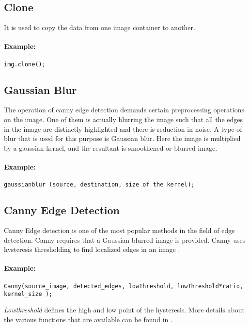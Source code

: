 \subsection{Clone}
\label{sec: Clone}
It is used to copy  the data from one image container to another.
\paragraph{Example:}
\begin{lstlisting}
img.clone();
\end{lstlisting}
\subsection{Gaussian Blur}
\label{sec: Gaussian Blur}
The operation of canny edge detection demands certain preprocessing operations on the image. One of them is actually blurring the image such that all the edges in the image are distinctly highlighted and there is reduction in noise. A type of blur that is used for this purpose is Gaussian blur. Here the image is multiplied by a gaussian kernel, and the resultant is smoothened or blurred image.
\paragraph{Example:}
\begin{lstlisting}
gaussianblur (source, destination, size of the kernel);
\end{lstlisting}
\subsection{Canny Edge Detection}
\label{sec: Canny}
Canny Edge detection is one of the most popular methods in the field of edge detection. Canny requires that a Gaussian blurred image is provided. Canny uses hysteresis thresholding to find localized edges in an image \cite{ding2001canny}.
\paragraph{Example:}
\begin{lstlisting}
Canny(source_image, detected_edges, lowThreshold, lowThreshold*ratio, kernel_size );
\end{lstlisting}
\textit{Lowthreshold} defines the high and low point of the hysteresis.
More details about the various functions that are available can be found in \cite{bradski2008learning}. 

